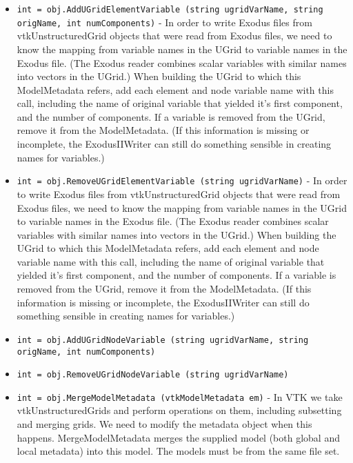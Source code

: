 \begin{itemize}
\item  \verb|int = obj.AddUGridElementVariable (string ugridVarName, string origName, int numComponents)| -    In order to write Exodus files from vtkUnstructuredGrid
   objects that were read from Exodus files, we need to know
   the mapping from variable names in the UGrid to variable
   names in the Exodus file.  (The Exodus reader combines
   scalar variables with similar names into vectors in the
   UGrid.)  When building the UGrid to which this
   ModelMetadata refers, add each element and node variable
   name with this call, including the name of original variable
   that yielded it's first component, and the number of components.
   If a variable is removed from the UGrid, remove it from
   the ModelMetadata.  (If this information is missing or
   incomplete, the ExodusIIWriter can still do something
   sensible in creating names for variables.)

\item  \verb|int = obj.RemoveUGridElementVariable (string ugridVarName)| -    In order to write Exodus files from vtkUnstructuredGrid
   objects that were read from Exodus files, we need to know
   the mapping from variable names in the UGrid to variable
   names in the Exodus file.  (The Exodus reader combines
   scalar variables with similar names into vectors in the
   UGrid.)  When building the UGrid to which this
   ModelMetadata refers, add each element and node variable
   name with this call, including the name of original variable
   that yielded it's first component, and the number of components.
   If a variable is removed from the UGrid, remove it from
   the ModelMetadata.  (If this information is missing or
   incomplete, the ExodusIIWriter can still do something
   sensible in creating names for variables.)

\item  \verb|int = obj.AddUGridNodeVariable (string ugridVarName, string origName, int numComponents)|

\item  \verb|int = obj.RemoveUGridNodeVariable (string ugridVarName)|

\item  \verb|int = obj.MergeModelMetadata (vtkModelMetadata em)| -    In VTK we take vtkUnstructuredGrids and perform
   operations on them, including subsetting and merging
   grids.  We need to modify the metadata object 
   when this happens.  MergeModelMetadata merges the supplied
   model (both global and local metadata) into this model.  
   The models must be from the same file set.


\end{itemize}
